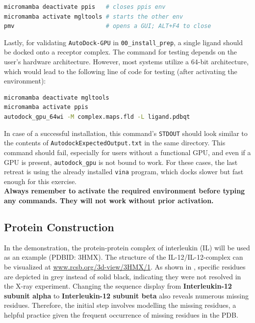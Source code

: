 \documentclass[9pt,tutorial]{livecoms}
\newcommand{\code}[1]{\colorbox{light-gray}{\texttt{#1}}}
\begin{document}
\begin{lstlisting}[language=bash]
micromamba deactivate ppis   # closes ppis env
micromamba activate mgltools # starts the other env
pmv                          # opens a GUI; ALT+F4 to close
\end{lstlisting}
Lastly, for validating \texttt{AutoDock-GPU} in \code{00\_install\_prep}, a single ligand should be docked onto a receptor complex. The command for testing depends on the user's hardware architecture. However, most systems utilize a 64-bit architecture, which would lead to the following line of code for testing (after activating the environment):
\begin{lstlisting}[language=bash]
micromamba deactivate mgltools
micromamba activate ppis
autodock_gpu_64wi -M complex.maps.fld -L ligand.pdbqt
\end{lstlisting}
In case of a successful installation, this command's \texttt{STDOUT} should look similar to the contents of \code{AutodockExpectedOutput.txt} in the same directory. This command should fail, especially for users without a functional GPU, and even if a GPU is present, \code{autodock\_gpu} is not bound to work. For these cases, the last retreat is using the already installed \code{vina} program, which docks slower but fast enough for this exercise.\\
\textbf{Always remember to activate the required environment before typing any commands. They will not work without prior activation.}



\subsection*{Protein Construction}
In the demonstration, the protein-protein complex of interleukin (IL) will be used as an example (PDBID: 3HMX\cite{Luo_2010}). The structure of the IL-12\textalpha/IL-12\textbeta-complex can be visualized at \url{www.rcsb.org/3d-view/3HMX/1}. As shown in , specific residues are depicted in grey instead of solid black, indicating they were not resolved in the X-ray experiment. Changing the sequence display from \textbf{Interleukin-12 subunit alpha} to \textbf{Interleukin-12 subunit beta} also reveals numerous missing residues. Therefore, the initial step involves modelling the missing residues, a helpful practice given the frequent occurrence of missing residues in the PDB.
\end{document}
